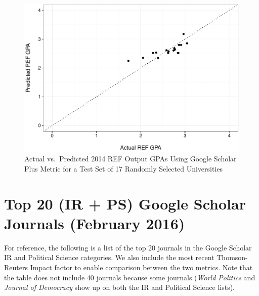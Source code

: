 \documentclass[]{article}
\begin{document}
\begin{figure}[htbp]
\centering
\includegraphics{README_files/figure-latex/unnamed-chunk-4-1.pdf}
\caption{Actual vs.~Predicted 2014 REF Output GPAs Using Google Scholar
Plus Metric for a Test Set of 17 Randomly Selected Universities}
\end{figure}

\section{Top 20 (IR + PS) Google Scholar Journals (February
2016)}\label{top-20-ir-ps-google-scholar-journals-february-2016}

For reference, the following is a list of the top 20 journals in the
Google Scholar IR and Political Science categories. We also include the
most recent Thomson-Reuters Impact factor to enable comparison between
the two metrics. Note that the table does not include 40 journals
because some journals (\emph{World Politics} and \emph{Journal of
Democracy} show up on both the IR and Political Science lists).
\end{document}
